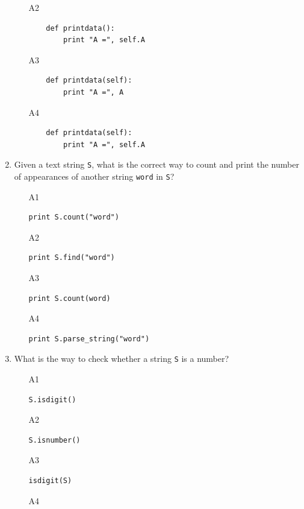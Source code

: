 \begin{enumerate}
\begin{enumerate}
\begin{verbatim}
\end{verbatim}
\item[A2] 
\begin{verbatim}
    def printdata():
        print "A =", self.A
\end{verbatim}
\item[A3] 
\begin{verbatim}
    def printdata(self):
        print "A =", A
\end{verbatim}
\item[A4] 
\begin{verbatim}
    def printdata(self):
        print "A =", self.A
\end{verbatim}
\end{enumerate}
\item Given a text string {\tt S}, what is the correct way to count and print the number 
      of appearances of another string {\tt word} in {\tt S}?
\begin{enumerate}
\item[A1] 
\begin{verbatim}
print S.count("word")
\end{verbatim}
\item[A2] 
\begin{verbatim}
print S.find("word")
\end{verbatim}
\item[A3] 
\begin{verbatim}
print S.count(word)
\end{verbatim}
\item[A4] 
\begin{verbatim}
print S.parse_string("word")
\end{verbatim}
\end{enumerate}
\item What is the way to check whether a string {\tt S} is a number?
\begin{enumerate}
\item[A1] 
\begin{verbatim}
S.isdigit()
\end{verbatim}
\item[A2] 
\begin{verbatim}
S.isnumber()
\end{verbatim}
\item[A3] 
\begin{verbatim}
isdigit(S)
\end{verbatim}
\item[A4] 
\begin{verbatim}

\end{verbatim}
\end{enumerate}
\end{enumerate}
